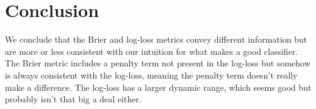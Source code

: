 \section{Conclusion}
\label{sec:conclusion}

We conclude that the Brier and log-loss metrics convey different information but are more or less consistent with our intuition for what makes a good classifier. The Brier metric includes a penalty term not present in the log-loss but somehow is always consistent with the log-loss, meaning the penalty term doesn't really make a difference. The log-loss has a larger dynamic range, which seems good but probably isn't that big a deal either.

